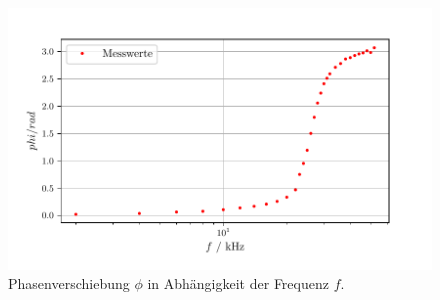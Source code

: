 \begin{figure}
  \centering
  \includegraphics{plotd.pdf}
  \caption{Phasenverschiebung $\phi$ in Abhängigkeit der Frequenz $f$.}
  \label{fig:Plot d}
\end{figure}